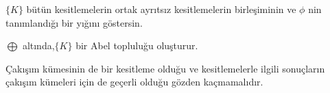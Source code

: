 \documentclass[11pt]{amsbook}
\begin{document}

	$\{K\}$ bütün kesitlemelerin ortak ayrıtsız kesitlemelerin birleşiminin ve $\phi$ nin tanımlandığı bir yığını göstersin.
	\begin{theorem}
	     $\bigoplus$ altında,$\{K\}$ bir Abel topluluğu oluşturur.
	\end{theorem}
	     
    Çakışım kümesinin de bir kesitleme olduğu ve kesitlemelerle ilgili sonuçların çakışım kümeleri için de geçerli olduğu gözden kaçmamalıdır.
	
\end{document}
